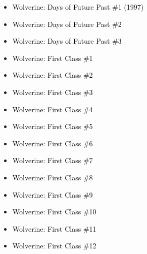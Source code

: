 \documentclass[12pt]{article}
\newcommand{\checkbox}{\raisebox{0.0ex}{\fbox{\rule{0ex}{1.5ex} \rule{1.5ex}{0ex}}}}
\begin{document}
\vspace{0.3cm}
\noindent
\begin{tcolorbox}[
  colback=white!95!gray,
  colframe=black,
  width=\textwidth,
  arc=4mm,
  auto outer arc,
  boxrule=0.8pt,
  left=8pt,right=8pt,top=8pt,bottom=8pt
]
\begin{itemize}[left=0pt,label={\checkbox}]
  \item \textcolor{black}{Wolverine: Days of Future Past \#1 (1997)}
  \item \textcolor{black}{Wolverine: Days of Future Past \#2}
  \item \textcolor{black}{Wolverine: Days of Future Past \#3}
  \item \textcolor{black}{Wolverine: First Class \#1}
  \item \textcolor{black}{Wolverine: First Class \#2}
  \item \textcolor{black}{Wolverine: First Class \#3}
  \item \textcolor{black}{Wolverine: First Class \#4}
  \item \textcolor{black}{Wolverine: First Class \#5}
  \item \textcolor{black}{Wolverine: First Class \#6}
  \item \textcolor{black}{Wolverine: First Class \#7}
  \item \textcolor{black}{Wolverine: First Class \#8}
  \item \textcolor{black}{Wolverine: First Class \#9}
  \item \textcolor{black}{Wolverine: First Class \#10}
  \item \textcolor{black}{Wolverine: First Class \#11}
  \item \textcolor{black}{Wolverine: First Class \#12}
\end{itemize}
\end{tcolorbox}

\newpage
{}
\end{document}
